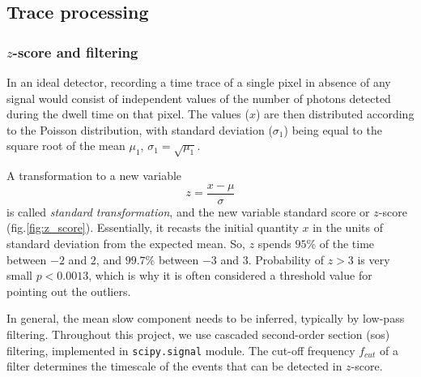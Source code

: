\documentclass[a4paper,11pt,oneside]{article}
\begin{document}
\subsection{Trace processing}

\subsubsection{$z$-score and filtering}

In an ideal detector, recording a time trace of a single pixel in absence of any signal would consist of independent values of the number of photons detected during the dwell time on that pixel.
The values ($x$) are then distributed according to the Poisson distribution, with standard deviation ($\sigma_1$) being equal to the square root of the mean $\mu_1$, $\sigma_1=\sqrt{\mu_1}$.

A transformation to a new variable %
$$z=\frac{x-\mu}{\sigma}$$
is called {\it standard transformation}, and the new variable standard score or $z$-score (fig.\ref{fig:z_score}). Essentially, it recasts the initial quantity $x$ in the units of standard deviation from the expected mean. So, $z$ spends $95$\% of the time between $-2$ and $2$, and $99.7$\% between $-3$ and $3$. Probability of $z>3$ is very small $p<0.0013$, which is why it is often considered a threshold value for pointing out the outliers.

In general, the mean slow component needs to be inferred, typically by low-pass filtering. Throughout this project, we use cascaded second-order section (sos) filtering, implemented in \verb|scipy.signal| module. The cut-off frequency $f_{cut}$ of a filter determines the timescale of the events that can be detected in $z$-score. 
\end{document}
